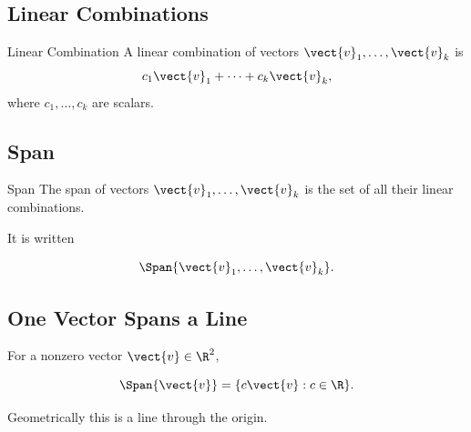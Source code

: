 \subsection{Linear Combinations}
\label{subsec:linear-combinations}

\begin{definitionbox}{Linear Combination}
A linear combination of vectors
\(\vect{v}_1,\ldots,\vect{v}_k\) is
\[ c_1\vect{v}_1+\cdots+c_k\vect{v}_k, \]
where \(c_1,\ldots,c_k\) are scalars.
\end{definitionbox}

\subsection{Span}
\label{subsec:span}

\begin{definitionbox}{Span}
The span of vectors
\(\vect{v}_1,\ldots,\vect{v}_k\) is the set of all their linear combinations.
\end{definitionbox}

It is written

\[ \Span\{\vect{v}_1,\ldots,\vect{v}_k\}. \]

\subsection{One Vector Spans a Line}
\label{subsec:one-vector-span}

For a nonzero vector \(\vect{v}\in\R^2\),

\[ \Span\{\vect{v}\}=\{c\vect{v}:c\in\R\}. \]

Geometrically this is a line through the origin.

\begin{center}
\end{center}

